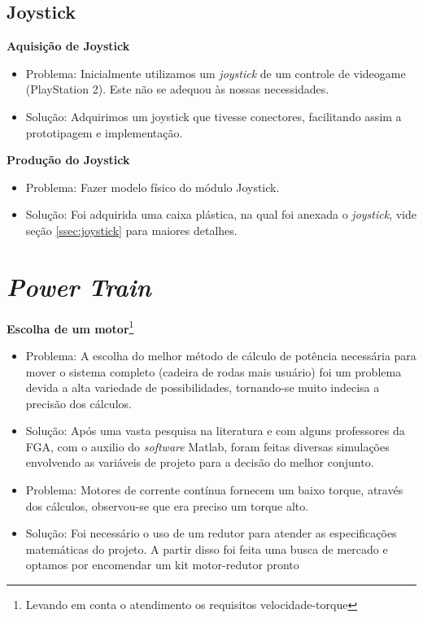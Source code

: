 \subsection{Joystick}

\textbf{Aquisição de Joystick}

 \begin{itemize}
  \item Problema: Inicialmente utilizamos um \textit{joystick} de um controle de videogame (PlayStation 2). Este não se adequou às nossas necessidades.
  \item Solução: Adquirimos um joystick que tivesse conectores, facilitando assim a prototipagem e implementação.
\end{itemize}

\textbf{Produção do Joystick}

\begin{itemize}

  \item Problema: Fazer modelo físico do módulo Joystick.
  \item Solução: Foi adquirida uma caixa plástica, na qual foi anexada o \textit{joystick}, vide seção \ref{ssec:joystick} para maiores detalhes.
\end{itemize}


\section{\textit{Power Train}}

\textbf{Escolha de um motor}\footnote{Levando em conta o atendimento os requisitos velocidade-torque}

 \begin{itemize}
  \item Problema: A escolha do melhor método de cálculo de potência necessária para mover o sistema completo (cadeira de rodas mais usuário) foi um problema devida a alta variedade de possibilidades, tornando-se muito indecisa a precisão dos cálculos.
  \item Solução: Após uma vasta pesquisa na literatura e com alguns professores da FGA, com o auxilio do \textit{software} Matlab, foram feitas diversas simulações envolvendo as variáveis de projeto para a decisão do melhor conjunto.

  \item Problema: Motores de corrente contínua fornecem um baixo torque, através dos cálculos, observou-se que era preciso um torque alto.
  \item Solução: Foi necessário o uso de um redutor para atender as especificações matemáticas do projeto. A partir disso foi feita uma busca de mercado e optamos por encomendar um kit motor-redutor pronto

 \end{itemize}

